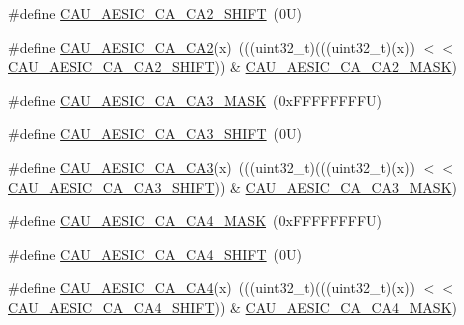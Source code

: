 \begin{DoxyCompactItemize}
\item 
\#define \mbox{\hyperlink{group___c_a_u___register___masks_ga24294c0df349c7b5264631d50b683247}{C\+A\+U\+\_\+\+A\+E\+S\+I\+C\+\_\+\+C\+A\+\_\+\+C\+A2\+\_\+\+S\+H\+I\+FT}}~(0\+U)
\item 
\#define \mbox{\hyperlink{group___c_a_u___register___masks_ga5442af2bec924cd321147bd405a1a191}{C\+A\+U\+\_\+\+A\+E\+S\+I\+C\+\_\+\+C\+A\+\_\+\+C\+A2}}(x)~(((uint32\+\_\+t)(((uint32\+\_\+t)(x)) $<$$<$ \mbox{\hyperlink{group___c_a_u___register___masks_ga24294c0df349c7b5264631d50b683247}{C\+A\+U\+\_\+\+A\+E\+S\+I\+C\+\_\+\+C\+A\+\_\+\+C\+A2\+\_\+\+S\+H\+I\+FT}})) \& \mbox{\hyperlink{group___c_a_u___register___masks_gaacb6f7c612e15617ec7318cff9480c0f}{C\+A\+U\+\_\+\+A\+E\+S\+I\+C\+\_\+\+C\+A\+\_\+\+C\+A2\+\_\+\+M\+A\+SK}})
\item 
\#define \mbox{\hyperlink{group___c_a_u___register___masks_ga889b99e5fda65da20c1e40cdf1633bdc}{C\+A\+U\+\_\+\+A\+E\+S\+I\+C\+\_\+\+C\+A\+\_\+\+C\+A3\+\_\+\+M\+A\+SK}}~(0x\+F\+F\+F\+F\+F\+F\+F\+F\+U)
\item 
\#define \mbox{\hyperlink{group___c_a_u___register___masks_gaa4221586809a5c86c3209735723f6427}{C\+A\+U\+\_\+\+A\+E\+S\+I\+C\+\_\+\+C\+A\+\_\+\+C\+A3\+\_\+\+S\+H\+I\+FT}}~(0\+U)
\item 
\#define \mbox{\hyperlink{group___c_a_u___register___masks_ga5113854b12720683b6e771319b35ce8c}{C\+A\+U\+\_\+\+A\+E\+S\+I\+C\+\_\+\+C\+A\+\_\+\+C\+A3}}(x)~(((uint32\+\_\+t)(((uint32\+\_\+t)(x)) $<$$<$ \mbox{\hyperlink{group___c_a_u___register___masks_gaa4221586809a5c86c3209735723f6427}{C\+A\+U\+\_\+\+A\+E\+S\+I\+C\+\_\+\+C\+A\+\_\+\+C\+A3\+\_\+\+S\+H\+I\+FT}})) \& \mbox{\hyperlink{group___c_a_u___register___masks_ga889b99e5fda65da20c1e40cdf1633bdc}{C\+A\+U\+\_\+\+A\+E\+S\+I\+C\+\_\+\+C\+A\+\_\+\+C\+A3\+\_\+\+M\+A\+SK}})
\item 
\#define \mbox{\hyperlink{group___c_a_u___register___masks_ga5f7f6b876abee0856218de45b4d3323e}{C\+A\+U\+\_\+\+A\+E\+S\+I\+C\+\_\+\+C\+A\+\_\+\+C\+A4\+\_\+\+M\+A\+SK}}~(0x\+F\+F\+F\+F\+F\+F\+F\+F\+U)
\item 
\#define \mbox{\hyperlink{group___c_a_u___register___masks_gabd609af8c8366c17977c9afb71ad3ca5}{C\+A\+U\+\_\+\+A\+E\+S\+I\+C\+\_\+\+C\+A\+\_\+\+C\+A4\+\_\+\+S\+H\+I\+FT}}~(0\+U)
\item 
\#define \mbox{\hyperlink{group___c_a_u___register___masks_ga79b687603e9671199241f6488b42c3f5}{C\+A\+U\+\_\+\+A\+E\+S\+I\+C\+\_\+\+C\+A\+\_\+\+C\+A4}}(x)~(((uint32\+\_\+t)(((uint32\+\_\+t)(x)) $<$$<$ \mbox{\hyperlink{group___c_a_u___register___masks_gabd609af8c8366c17977c9afb71ad3ca5}{C\+A\+U\+\_\+\+A\+E\+S\+I\+C\+\_\+\+C\+A\+\_\+\+C\+A4\+\_\+\+S\+H\+I\+FT}})) \& \mbox{\hyperlink{group___c_a_u___register___masks_ga5f7f6b876abee0856218de45b4d3323e}{C\+A\+U\+\_\+\+A\+E\+S\+I\+C\+\_\+\+C\+A\+\_\+\+C\+A4\+\_\+\+M\+A\+SK}})
$$
\end{DoxyCompactItemize}
